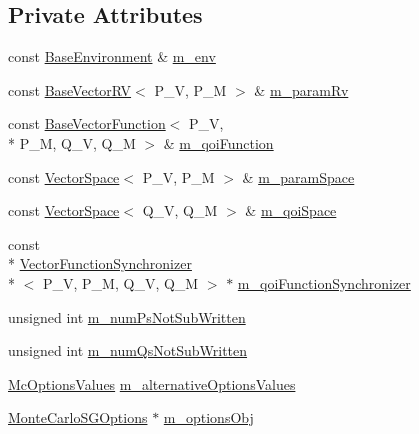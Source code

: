 \subsection*{Private Attributes}
\begin{DoxyCompactItemize}
\item 
const \hyperlink{class_q_u_e_s_o_1_1_base_environment}{Base\-Environment} \& \hyperlink{class_q_u_e_s_o_1_1_monte_carlo_s_g_a30055a359b22cde54681679aed8ae6e7}{m\-\_\-env}
\item 
const \hyperlink{class_q_u_e_s_o_1_1_base_vector_r_v}{Base\-Vector\-R\-V}$<$ P\-\_\-\-V, P\-\_\-\-M $>$ \& \hyperlink{class_q_u_e_s_o_1_1_monte_carlo_s_g_a938acc7072543d727fe35fa0f5d9013f}{m\-\_\-param\-Rv}
\item 
const \hyperlink{class_q_u_e_s_o_1_1_base_vector_function}{Base\-Vector\-Function}$<$ P\-\_\-\-V, \\*
P\-\_\-\-M, Q\-\_\-\-V, Q\-\_\-\-M $>$ \& \hyperlink{class_q_u_e_s_o_1_1_monte_carlo_s_g_ae0c3b848d58b4f79d5e3741e70fbcd78}{m\-\_\-qoi\-Function}
\item 
const \hyperlink{class_q_u_e_s_o_1_1_vector_space}{Vector\-Space}$<$ P\-\_\-\-V, P\-\_\-\-M $>$ \& \hyperlink{class_q_u_e_s_o_1_1_monte_carlo_s_g_a64620f0dd80c96f86918e1d711767b6f}{m\-\_\-param\-Space}
\item 
const \hyperlink{class_q_u_e_s_o_1_1_vector_space}{Vector\-Space}$<$ Q\-\_\-\-V, Q\-\_\-\-M $>$ \& \hyperlink{class_q_u_e_s_o_1_1_monte_carlo_s_g_a1df92e2ff2e7fa19d4ea158e71670ca3}{m\-\_\-qoi\-Space}
\item 
const \\*
\hyperlink{class_q_u_e_s_o_1_1_vector_function_synchronizer}{Vector\-Function\-Synchronizer}\\*
$<$ P\-\_\-\-V, P\-\_\-\-M, Q\-\_\-\-V, Q\-\_\-\-M $>$ $\ast$ \hyperlink{class_q_u_e_s_o_1_1_monte_carlo_s_g_a5a55a6fa3562ec8253089ac242bc52ba}{m\-\_\-qoi\-Function\-Synchronizer}
\item 
unsigned int \hyperlink{class_q_u_e_s_o_1_1_monte_carlo_s_g_a1bd46f12e850ab8d239205aafdae72af}{m\-\_\-num\-Ps\-Not\-Sub\-Written}
\item 
unsigned int \hyperlink{class_q_u_e_s_o_1_1_monte_carlo_s_g_af1d99dc1a3384fd294da7464ba1bda5f}{m\-\_\-num\-Qs\-Not\-Sub\-Written}
\item 
\hyperlink{class_q_u_e_s_o_1_1_mc_options_values}{Mc\-Options\-Values} \hyperlink{class_q_u_e_s_o_1_1_monte_carlo_s_g_a7f83d2e651b4de98ae3d2ccc924e23aa}{m\-\_\-alternative\-Options\-Values}
\item 
\hyperlink{class_q_u_e_s_o_1_1_monte_carlo_s_g_options}{Monte\-Carlo\-S\-G\-Options} $\ast$ \hyperlink{class_q_u_e_s_o_1_1_monte_carlo_s_g_acf7ce935648fd3a5d0ee23685708b4ca}{m\-\_\-options\-Obj}
\end{DoxyCompactItemize}
